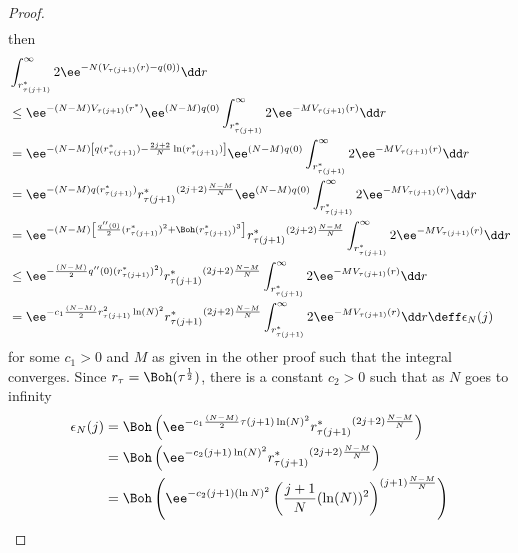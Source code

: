 \begin{proof}
\begin{align}
\end{align}
then
\begin{align}
	&  \int_{r^*_{\tau(j+1)}}^{\infty} 2 \ee^{-N (V_{\tau(j+1)}(r) - q(0))} \dd r \\
	& \leq  \ee^{ - (N - M) V_{\tau(j+1)}(r^*)} \ee^{(N-M) q(0)}\int_{r^*_{\tau(j+1)}}^{\infty} 2 \ee^{-M V_{\tau(j+1)}(r) } \dd r \\
	& =  \ee^{ - (N - M) \left[ q(r^*_{\tau(j+1)}) - \frac{2j+2}{N} \ln(r^*_{\tau(j+1)}) \right]} \ee^{(N-M) q(0)} \int_{r^*_{\tau(j+1)}}^{\infty} 2 \ee^{-M V_{\tau(j+1)}(r) } \dd r \\
	& = \ee^{- (N-M) q(r^*_{\tau(j+1)})} {r^*_{\tau(j+1)}}^{(2j+2) \frac{N-M}{N}} \ee^{(N-M) q(0)} \int_{r^*_{\tau(j+1)}}^{\infty} 2 \ee^{-M V_{\tau(j+1)}(r) } \dd r \\
	& = \ee^{- (N-M) \left[\frac{q''(0)}{2}  (r^*_{\tau(j+1)})^2 + \Boh(r^*_{\tau(j+1)})^3\right] } {r^*_{\tau(j+1)}}^{(2j+2) \frac{N-M}{N}} \int_{r^*_{\tau(j+1)}}^{\infty} 2 \ee^{-M V_{\tau(j+1)}(r)} \dd r \\
	& \leq \ee^{- \frac{(N-M)}{2} q''(0) (r^*_{\tau(j+1)})^2)} {r^*_{\tau(j+1)}}^{(2j+2)\frac{N-M}{N}} \int_{r^*_{\tau(j+1)}}^{\infty} 2 \ee^{-M V_{\tau(j+1)}(r)} \dd r \\
	& = \ee^{- c_1 \frac{(N-M)}{2}r_{\tau(j+1)}^2 \ln(N)^2} {r^*_{\tau(j+1)}}^{(2j+2)\frac{N-M}{N}} \int_{r^*_{\tau(j+1)}}^{\infty} 2 \ee^{-M V_{\tau(j+1)}(r)} \dd r \deff \epsilon_N(j) \\
\end{align}
for some $c_1 > 0$ and $M$ as given in the other proof such that the integral converges.  Since $r_\tau = \Boh(\tau^{\frac{1}{2}})$, there is a constant $c_2 > 0$ such that as $N$ goes to infinity
\begin{align}
	\epsilon_N(j)  & = \Boh \left(\ee^{- c_1 \frac{(N-M)}{2} \tau(j+1) \ln(N)^2} {r^*_{\tau(j+1)}}^{(2j+2)\frac{N-M}{N}}\right) \\
	&= \Boh \left(\ee^{- c_2 (j+1) \ln(N)^2} {r^*_{\tau(j+1)}}^{(2j+2)\frac{N-M}{N}}\right) \\
	& = \Boh\left(\ee^{-c_2 (j + 1) (\ln N)^2}  \left(\frac{j+1}{N} (\ln(N))^2 \right)^{(j+1) \frac{N-M}{N}} \right)
\end{align}


\end{proof}

